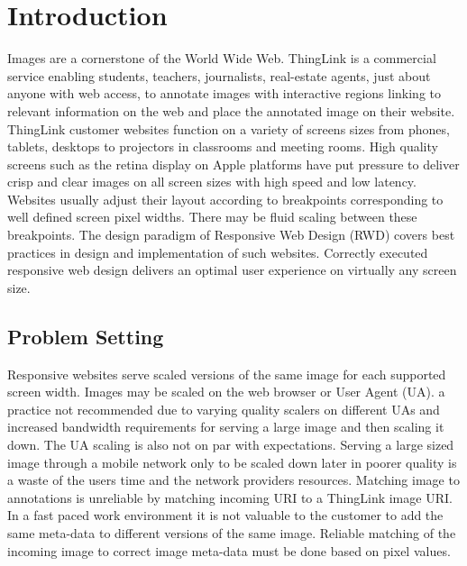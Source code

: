 \documentclass[english,12pt,a4paper,pdftex,elec,utf8, table]{aaltothesis}
\begin{document}
\section{Introduction}

\thispagestyle{empty}
Images are a cornerstone of the World Wide Web. ThingLink is a commercial service enabling students, teachers, journalists, real-estate agents, just about anyone with web access, to annotate images with interactive regions linking to relevant information on the web and place the annotated image on their website. ThingLink customer websites function on a variety of screens sizes from phones, tablets, desktops to projectors in classrooms and meeting rooms. High quality screens such as the retina display on Apple platforms have put pressure to deliver crisp and clear images on all screen sizes with high speed and low latency. Websites usually adjust their layout according to breakpoints corresponding to well defined screen pixel widths. There may be fluid scaling between these breakpoints. The design paradigm of Responsive Web Design (RWD) covers best practices in design and implementation of such websites. Correctly executed responsive web design delivers an optimal user experience on virtually any screen size.
\subsection{Problem Setting}
Responsive websites serve scaled versions of the same image for each supported screen width. Images may be scaled on the web browser or User Agent (UA). a practice not recommended due to varying quality scalers on different UAs and increased bandwidth requirements for serving a large image and then scaling it down. The UA scaling is also not on par with expectations. Serving a large sized image through a mobile network only to be scaled down later in poorer quality is a waste of the users time and the network providers resources. Matching image to annotations is unreliable by matching incoming URI to a ThingLink image URI. In a fast paced work environment it is not valuable to the customer to add the same meta-data to different versions of the same image. Reliable matching of the incoming image to correct image meta-data must be done based on pixel values.
\end{document}

